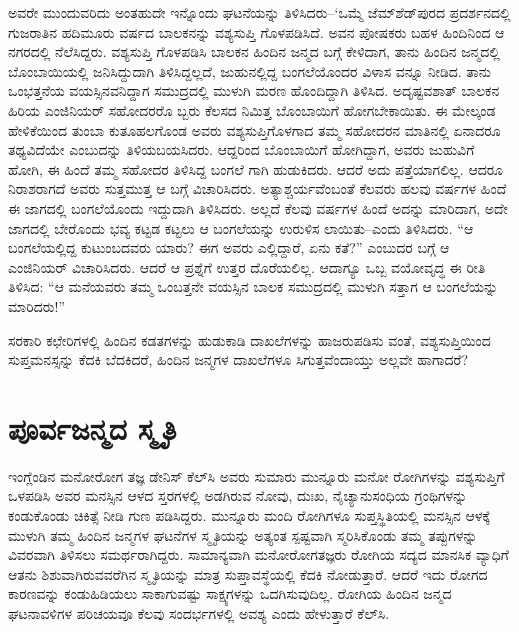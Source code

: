 ಅವರೇ ಮುಂದುವರಿದು ಅಂತಹುದೇ ಇನ್ನೊಂದು ಘಟನೆಯನ್ನು ತಿಳಿಸಿದರು–‘ಒಮ್ಮೆ ಜೆಮ್​ಶೆಡ್​ಪುರದ ಪ್ರದರ್ಶನದಲ್ಲಿ ಗುಜರಾತಿನ ಹದಿಮೂರು ವರ್ಷದ ಬಾಲಕನನ್ನು ವಶ್ಯಸುಪ್ತಿ ಗೊಳಪಡಿಸಿದೆ. ಅವನ ಪೋಷಕರು ಬಹಳ ಹಿಂದಿನಿಂದ ಆ ನಗರದಲ್ಲಿ ನೆಲೆಸಿದ್ದರು. ವಶ್ಯಸುಪ್ತಿ ಗೊಳಪಡಿಸಿ ಬಾಲಕನ ಹಿಂದಿನ ಜನ್ಮದ ಬಗ್ಗೆ ಕೇಳಿದಾಗ, ತಾನು ಹಿಂದಿನ ಜನ್ಮದಲ್ಲಿ ಬೊಂಬಾಯಿಯಲ್ಲಿ ಜನಿಸಿದ್ದುದಾಗಿ ತಿಳಿಸಿದ್ದಲ್ಲದೆ, ಜುಹುನಲ್ಲಿದ್ದ ಬಂಗಲೆಯೊಂದರ ವಿಳಾಸ ವನ್ನೂ ನೀಡಿದ. ತಾನು ಒಂಭತ್ತನೆಯ ವಯಸ್ಸಿನವನಿದ್ದಾಗ ಸಮುದ್ರದಲ್ಲಿ ಮುಳುಗಿ ಮರಣ ಹೊಂದಿದ್ದಾಗಿ ತಿಳಿಸಿದ. ಅದೃಷ್ಟವಶಾತ್ ಬಾಲಕನ ಹಿರಿಯ ಎಂಜಿನಿಯರ್ ಸಹೋದರರೊ ಬ್ಬರು ಕೆಲಸದ ನಿಮಿತ್ತ ಬೊಂಬಾಯಿಗೆ ಹೋಗಬೇಕಾಯಿತು. ಈ ಮೇಲ್ಕಂಡ ಹೇಳಿಕೆಯಿಂದ ತುಂಬಾ ಕುತೂಹಲಗೊಂಡ ಅವರು ವಶ್ಯಸುಪ್ತಿಗೊಳಗಾದ ತಮ್ಮ ಸಹೋದರನ ಮಾತಿನಲ್ಲಿ ಏನಾದರೂ ತಥ್ಯವಿದೆಯೇ ಎಂಬುದನ್ನು ತಿಳಿಯಬಯಸಿದರು. ಆದ್ದರಿಂದ ಬೊಂಬಾಯಿಗೆ ಹೋಗಿದ್ದಾಗ, ಅವರು ಜುಹುವಿಗೆ ಹೋಗಿ, ಈ ಹಿಂದೆ ತಮ್ಮ ಸಹೋದರ ತಿಳಿಸಿದ್ದ ಬಂಗಲೆ ಗಾಗಿ ಹುಡುಕಿದರು. ಆದರೆ ಅದು ಪತ್ತೆಯಾಗಲಿಲ್ಲ. ಆದರೂ ನಿರಾಶರಾಗದೆ ಅವರು ಸುತ್ತಮುತ್ತ ಆ ಬಗ್ಗೆ ವಿಚಾರಿಸಿದರು. ಅತ್ಯಾಶ್ಚರ್ಯವೆಂಬಂತೆ ಕೆಲವರು ಹಲವು ವರ್ಷಗಳ ಹಿಂದೆ ಈ ಜಾಗದಲ್ಲಿ ಬಂಗಲೆಯೊಂದು ಇದ್ದುದಾಗಿ ತಿಳಿಸಿದರು. ಅಲ್ಲದೆ ಕೆಲವು ವರ್ಷಗಳ ಹಿಂದೆ ಅದನ್ನು ಮಾರಿದಾಗ, ಅದೇ ಜಾಗದಲ್ಲಿ ಬೇರೊಂದು ಭವ್ಯ ಕಟ್ಟಡ ಕಟ್ಟಲು ಆ ಬಂಗಲೆಯನ್ನು ಉರುಳಿಸ ಲಾಯಿತು–ಎಂದು ತಿಳಿಸಿದರು. “ಆ ಬಂಗಲೆಯಲ್ಲಿದ್ದ ಕುಟುಂಬದವರು ಯಾರು? ಈಗ ಅವರು ಎಲ್ಲಿದ್ದಾರೆ, ಏನು ಕತೆ?” ಎಂಬುದರ ಬಗ್ಗೆ ಆ ಎಂಜಿನಿಯರ್ ವಿಚಾರಿಸಿದರು. ಆದರೆ ಆ ಪ್ರಶ್ನೆಗೆ ಉತ್ತರ ದೊರೆಯಲಿಲ್ಲ. ಆದಾಗ್ಯೂ ಒಬ್ಬ ವಯೋವೃದ್ಧ ಈ ರೀತಿ ತಿಳಿಸಿದ: “ಆ ಮನೆಯವರು ತಮ್ಮ ಒಂಬತ್ತನೇ ವಯಸ್ಸಿನ ಬಾಲಕ ಸಮುದ್ರದಲ್ಲಿ ಮುಳುಗಿ ಸತ್ತಾಗ ಆ ಬಂಗಲೆಯನ್ನು ಮಾರಿದರು!”

ಸರಕಾರಿ ಕಛೇರಿಗಳಲ್ಲಿ ಹಿಂದಿನ ಕಡತಗಳನ್ನು ಹುಡುಕಾಡಿ ದಾಖಲೆಗಳನ್ನು ಹಾಜರುಪಡಿಸು ವಂತೆ, ವಶ್ಯಸುಪ್ತಿಯಿಂದ ಸುಪ್ತಮನಸ್ಸನ್ನು ಕೆದಕಿ ಬೆದಕಿದರೆ, ಹಿಂದಿನ ಜನ್ಮಗಳ ದಾಖಲೆಗಳೂ ಸಿಗುತ್ತವೆಂದಾಯ್ತು ಅಲ್ಲವೇ ಹಾಗಾದರೆ?


\section{ಪೂರ್ವಜನ್ಮದ ಸ್ಮೃತಿ}

ಇಂಗ್ಲೆಂಡಿನ ಮನೋರೋಗ ತಜ್ಞ ಡೇನಿಸ್ ಕೆಲ್​ಸಿ ಅವರು ಸುಮಾರು ಮುನ್ನೂರು ಮನೋ ರೋಗಿಗಳನ್ನು ವಶ್ಯಸುಪ್ತಿಗೆ ಒಳಪಡಿಸಿ ಅವರ ಮನಸ್ಸಿನ ಆಳದ ಸ್ತರಗಳಲ್ಲಿ ಅಡಗಿರುವ ನೋವು, ದುಃಖ, ನೈಚ್ಯಾನುಸಂಧಿಯ ಗ್ರಂಥಿಗಳನ್ನು  ಕಂಡುಕೊಂಡು ಚಿಕಿತ್ಸೆ ನೀಡಿ ಗುಣ ಪಡಿಸಿದ್ದರು. ಮುನ್ನೂರು ಮಂದಿ ರೋಗಿಗಳೂ ಸುಪ್ತಸ್ಥಿತಿಯಲ್ಲಿ ಮನಸ್ಸಿನ ಆಳಕ್ಕೆ ಮುಳುಗಿ ತಮ್ಮ ಹಿಂದಿನ ಜನ್ಮಗಳ ಘಟನೆಗಳ ಸ್ಮೃತಿಯನ್ನು ಅತ್ಯಂತ ಸ್ಪಷ್ಟವಾಗಿ ಸ್ಮರಿಸಿಕೊಂಡು ತಮ್ಮ ತಪ್ಪುಗಳನ್ನು ವಿವರವಾಗಿ ತಿಳಿಸಲು ಸಮರ್ಥರಾಗಿದ್ದರು. ಸಾಮಾನ್ಯವಾಗಿ ಮನೋರೋಗತಜ್ಞರು ರೋಗಿಯ ಸದ್ಯದ ಮಾನಸಿಕ ವ್ಯಾಧಿಗೆ ಆತನು ಶಿಶುವಾಗಿರುವವರೆಗಿನ ಸ್ಮೃತಿಯನ್ನು ಮಾತ್ರ ಸುಪ್ತಾವಸ್ಥೆಯಲ್ಲಿ ಕೆದಕಿ ನೋಡುತ್ತಾರೆ. ಆದರೆ ಇದು ರೋಗದ ಕಾರಣವನ್ನು ಕಂಡುಹಿಡಿಯಲು ಸಾಕಾಗುವಷ್ಟು ಸಾಕ್ಷ್ಯಗಳನ್ನು ಒದಗಿಸುವುದಿಲ್ಲ. ರೋಗಿಯ ಹಿಂದಿನ ಜನ್ಮದ ಘಟನಾವಳಿಗಳ ಪರಿಚಯವೂ ಕೆಲವು ಸಂದರ್ಭಗಳಲ್ಲಿ ಅವಶ್ಯ ಎಂದು ಹೇಳುತ್ತಾರೆ ಕೆಲ್​ಸಿ.

